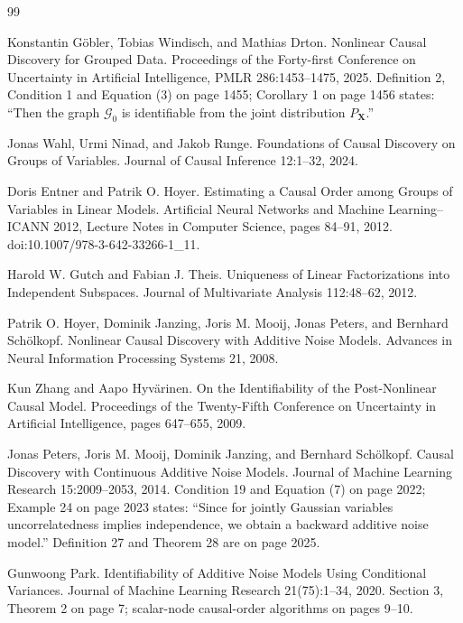 \documentclass{article}
\begin{document}
\begin{thebibliography}{99}

   Konstantin Göbler, Tobias Windisch, and Mathias Drton. Nonlinear Causal Discovery for Grouped Data. Proceedings of the Forty-first Conference on Uncertainty in Artificial Intelligence, PMLR 286:1453--1475, 2025. Definition 2, Condition 1 and Equation (3) on page 1455; Corollary 1 on page 1456 states: ``Then the graph \(\mathcal G_0\) is identifiable from the joint distribution \(P_{\mathbf X}\).''

   Jonas Wahl, Urmi Ninad, and Jakob Runge. Foundations of Causal Discovery on Groups of Variables. Journal of Causal Inference 12:1--32, 2024.

   Doris Entner and Patrik O. Hoyer. Estimating a Causal Order among Groups of Variables in Linear Models. Artificial Neural Networks and Machine Learning--ICANN 2012, Lecture Notes in Computer Science, pages 84--91, 2012. doi:10.1007/978-3-642-33266-1\_11.

   Harold W. Gutch and Fabian J. Theis. Uniqueness of Linear Factorizations into Independent Subspaces. Journal of Multivariate Analysis 112:48--62, 2012.

   Patrik O. Hoyer, Dominik Janzing, Joris M. Mooij, Jonas Peters, and Bernhard Schölkopf. Nonlinear Causal Discovery with Additive Noise Models. Advances in Neural Information Processing Systems 21, 2008.

   Kun Zhang and Aapo Hyvärinen. On the Identifiability of the Post-Nonlinear Causal Model. Proceedings of the Twenty-Fifth Conference on Uncertainty in Artificial Intelligence, pages 647--655, 2009.

   Jonas Peters, Joris M. Mooij, Dominik Janzing, and Bernhard Schölkopf. Causal Discovery with Continuous Additive Noise Models. Journal of Machine Learning Research 15:2009--2053, 2014. Condition 19 and Equation (7) on page 2022; Example 24 on page 2023 states: ``Since for jointly Gaussian variables uncorrelatedness implies independence, we obtain a backward additive noise model.'' Definition 27 and Theorem 28 are on page 2025.

   Gunwoong Park. Identifiability of Additive Noise Models Using Conditional Variances. Journal of Machine Learning Research 21(75):1--34, 2020. Section 3, Theorem 2 on page 7; scalar-node causal-order algorithms on pages 9--10.


\end{thebibliography}
\end{document}
